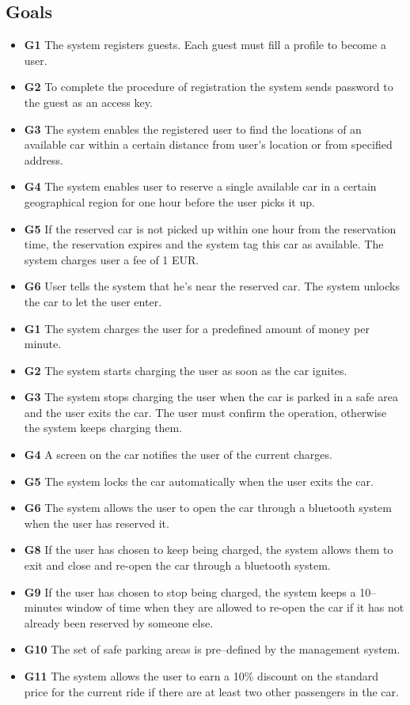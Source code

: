 \documentclass{article}
\begin{document}
		\subsection{Goals}
			\begin{itemize}
				\item \textbf{G1} The system registers guests. Each guest must fill a profile to become a user.
				\item \textbf{G2} To complete the procedure of registration the system sends password to the guest as an access key.
				\item \textbf{G3} The system enables the registered user to find the locations of an available car within a certain distance from user's location or from specified address.
				\item \textbf{G4} The system enables user to reserve a single available car in a certain geographical region for one hour before the user picks it up.
				\item \textbf{G5} If the reserved car is not picked up within one hour from the reservation time, the reservation expires and the system tag this car as available. The system charges user a fee of 1 EUR. 
				\item \textbf{G6} User tells the system that he's near the reserved car. The system unlocks the car to let the user enter.  

				\item \textbf{G1} The system charges the user for a predefined amount of money per minute.
				\item \textbf{G2} The system starts charging the user as soon as the car ignites.
				\item \textbf{G3} The system stops charging the user when the car is parked in a safe area and the user exits the car. The user must confirm the operation, otherwise the system keeps charging them. 
				\item \textbf{G4} A screen on the car notifies the user of the current charges.
				\item \textbf{G5} The system locks the car automatically when the user exits the car. 
				\item \textbf{G6} The system allows the user to open the car through a bluetooth system when the user has reserved it.
				\item \textbf{G8} If the user has chosen to keep being charged, the system allows them to exit and close and re-open the car through a bluetooth system.
				\item \textbf{G9} If the user has chosen to stop being charged, the system keeps a 10–minutes window of time when they are allowed to re-open the car if it has not already been reserved by someone else.
				\item \textbf{G10} The set of safe parking areas is pre–defined by the management system.
				\item \textbf{G11} The system allows the user to earn a 10\% discount on the standard price for the current ride if there are at least two other passengers in the car.


\end{itemize}
\end{document}
